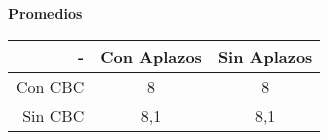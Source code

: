 \begin{center}
\textbf{Promedios}

  \begin{tabular}{|r|c|c|}
    \hline
    - & Con Aplazos & Sin Aplazos \\
    \hline
    Con CBC & 8 & 8 \\
    \hline
    Sin CBC & 8,1 & 8,1 \\
    \hline
  \end{tabular}

\end{center}
